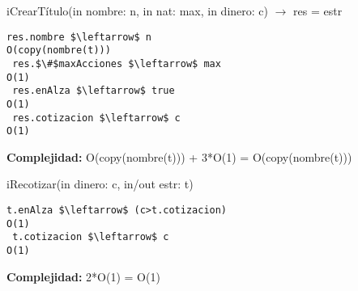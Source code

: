 iCrearT\'itulo(in nombre: n, in nat: max, in dinero: c) $\rightarrow$ res = estr
\begin{lstlisting}[mathescape]
 res.nombre $\leftarrow$ n                                                        O(copy(nombre(t)))
 res.$\#$maxAcciones $\leftarrow$ max                                                 O(1)
 res.enAlza $\leftarrow$ true                                                     O(1)
 res.cotizacion $\leftarrow$ c                                                    O(1)
\end{lstlisting}
\textbf{Complejidad:} O(copy(nombre(t))) + 3*O(1) = O(copy(nombre(t)))


iRecotizar(in dinero: c, in/out estr: t)
\begin{lstlisting}[mathescape]
 t.enAlza $\leftarrow$ (c>t.cotizacion)                                           O(1)
 t.cotizacion $\leftarrow$ c                                                      O(1)
\end{lstlisting}
\textbf{Complejidad:} 2*O(1) = O(1)